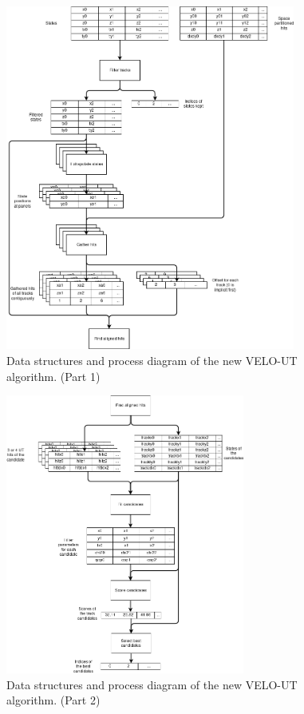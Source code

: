 \documentclass[12pt]{article}
\begin{document}
\begin{figure}[H]
	\begin{center}
		\includegraphics[width=0.85\textwidth]{velout_opt_datastruct_flow_p1}
	\end{center}
	\caption{Data structures and process diagram of the new VELO-UT algorithm. (Part 1)}
	\label{fig_velout_opt_datastruct_flow_p1}
\end{figure}

\begin{figure}[H]
	\begin{center}
		\includegraphics[width=0.7\textwidth]{velout_opt_datastruct_flow_p2}
	\end{center}
	\caption{Data structures and process diagram of the new VELO-UT algorithm. (Part 2)}
	\label{fig_velout_opt_datastruct_flow_p2}
\end{figure}
\end{document}
